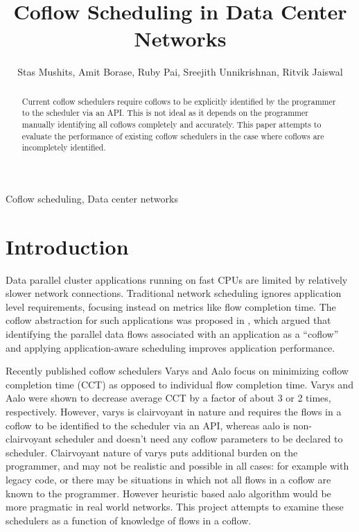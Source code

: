 \documentclass[conference]{IEEEtran}
\title{Coflow Scheduling in Data Center Networks}
\begin{document}
\author{ Stas Mushits, Amit Borase, Ruby Pai, Sreejith Unnikrishnan, Ritvik Jaiswal }

\maketitle


\begin{abstract}
Current coflow schedulers require coflows to be explicitly identified by the programmer to the scheduler via an API. This is not ideal as it depends on the programmer manually identifying all coflows completely and accurately. This paper attempts to evaluate the performance of existing coflow schedulers in the case where coflows are incompletely identified.
\end{abstract}

\begin{IEEEkeywords}
Coflow scheduling, Data center networks
\end{IEEEkeywords}

\section{Introduction}

Data parallel cluster applications running on fast CPUs are limited by relatively slower network connections. Traditional network scheduling ignores application level requirements, focusing instead on metrics like flow completion time. The coflow abstraction for such applications was proposed in \cite{coflow}, which argued that identifying the parallel data flows associated with an application as a ``coflow'' and applying application-aware scheduling improves application performance.

Recently published coflow schedulers Varys \cite{varys} and Aalo \cite{aalo} focus on minimizing coflow completion time (CCT) as opposed to individual flow completion time. Varys and Aalo were shown to decrease average CCT by a factor of about 3 or 2 times, respectively. However, varys is clairvoyant in nature and requires the flows in a coflow to be identified to the scheduler via an API, whereas aalo is non-clairvoyant scheduler and doesn't need any coflow parameters to be declared to scheduler. Clairvoyant nature of varys puts additional burden on the programmer, and may not be realistic and possible in all cases: for example with legacy code, or there may be situations in which not all flows in a coflow are known to the programmer. However heuristic based aalo algorithm would be more pragmatic in real world networks. This project attempts to examine these schedulers as a function of knowledge of flows in a coflow.
\end{document}
